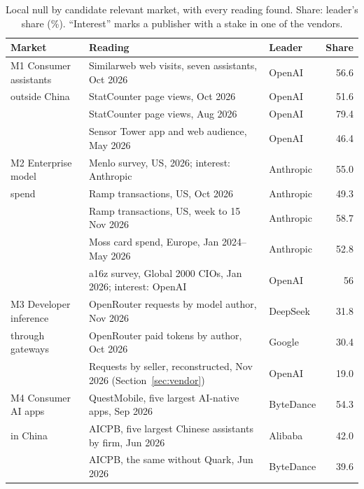 \documentclass[11pt]{article}
\begin{document}
\begin{table}[t]
\centering\footnotesize
\caption{Local null by candidate relevant market, with every reading found. Share: leader's share (\%). ``Interest'' marks a publisher with a stake in one of the vendors.}
\label{tab:markets}
\begin{tabularx}{\textwidth}{@{}L{3.8cm} X l r@{}}
\toprule
Market & Reading & Leader & Share \\
\midrule
M1 Consumer assistants & Similarweb web visits, seven assistants, Oct 2026 \cite{momentic2026chatbots} & OpenAI & 56.6 \\
outside China & StatCounter page views, Oct 2026 \cite{statcounter2026} & OpenAI & 51.6 \\
 & StatCounter page views, Aug 2026 \cite{statcounter2026} & OpenAI & 79.4 \\
 & Sensor Tower app and web audience, May 2026 \cite{sensortower2026state} & OpenAI & 46.4 \\
\addlinespace
M2 Enterprise model & Menlo survey, US, 2026; interest: Anthropic \cite{menlo2026state} & Anthropic & 55.0 \\
spend & Ramp transactions, US, Oct 2026 \cite{ramp2026index} & Anthropic & 49.3 \\
 & Ramp transactions, US, week to 15 Nov 2026 \cite{ramp2026index} & Anthropic & 58.7 \\
 & Moss card spend, Europe, Jan 2024--May 2026 \cite{moss2026spend} & Anthropic & 52.8 \\
 & a16z survey, Global 2000 CIOs, Jan 2026; interest: OpenAI \cite{a16z2026cio} & OpenAI & 56 \\
\addlinespace
M3 Developer inference & OpenRouter requests by model author, Nov 2026 \cite{openrouter2026rankings} & DeepSeek & 31.8 \\
through gateways & OpenRouter paid tokens by author, Oct 2026 \cite{aimultiple2026share} & Google & 30.4 \\
 & Requests by seller, reconstructed, Nov 2026 (Section~\ref{sec:vendor}) & OpenAI & 19.0 \\
\addlinespace
M4 Consumer AI apps & QuestMobile, five largest AI-native apps, Sep 2026 \cite{questmobile2026q3} & ByteDance & 54.3 \\
in China & AICPB, five largest Chinese assistants by firm, Jun 2026 \cite{aicpb2026june} & Alibaba & 42.0 \\
 & AICPB, the same without Quark, Jun 2026 \cite{aicpb2026june} & ByteDance & 39.6 \\
\bottomrule
\end{tabularx}
\end{table}
\end{document}
